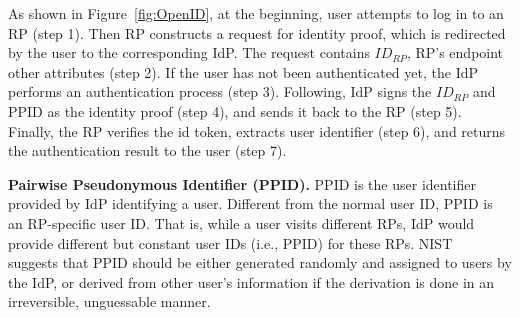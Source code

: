 As shown in Figure~\ref{fig:OpenID}, 
at the beginning, user attempts to log in to an RP (step 1). Then RP constructs a request for identity proof, which is redirected by the user to the corresponding IdP. The request contains $ID_{RP}$, RP's endpoint other attributes (step 2). If the user has not been authenticated yet, the IdP performs an authentication process (step 3). Following, IdP signs the $ID_{RP}$ and PPID as the identity proof (step 4), and sends it back to the RP (step 5). Finally, the RP verifies the id token, extracts user identifier (step 6), and returns the authentication result to the user (step 7).

\vspace{1mm}\noindent\textbf{Pairwise Pseudonymous Identifier (PPID).} 
PPID is the user identifier provided by IdP identifying a user. Different from the normal user ID, PPID is an RP-specific user ID. That is, while a user visits different RPs, IdP would provide different but constant user IDs (i.e., PPID) for these RPs.    
NIST~\cite{NIST2017draft} suggests that PPID should be either generated randomly and assigned to users by the IdP, or derived from other user's information if the derivation is done in an irreversible, unguessable manner. 


